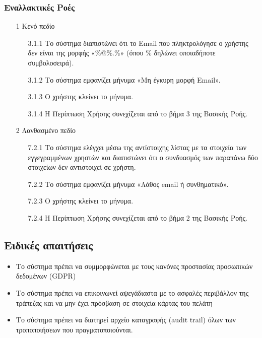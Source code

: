 \documentclass[12pt,a4paper,twoside]{book}
\begin{document}
\subsubsection{Εναλλακτικές Ροές}
\begin{enumerate}
  \item[1 ] Κενό πεδίο  %
        \begin{enumerate}
          \item[3.1.1 ] Το σύστημα διαπιστώνει ότι το Email που πληκτρολόγησε ο χρήστης δεν είναι της μορφής «\%@\%.\%» (όπου \% δηλώνει οποιαδήποτε συμβολοσειρά). %
          \item[3.1.2 ] Το σύστημα εμφανίζει μήνυμα «Μη έγκυρη μορφή Email». %
          \item[3.1.3 ] Ο χρήστης κλείνει το μήνυμα. %
          \item[3.1.4 ] Η Περίπτωση Χρήσης συνεχίζεται από το βήμα 3 της Βασικής Ροής. %
        \end{enumerate}
  \item[2 ] Λανθασμένο πεδίο %
        \begin{enumerate}
          \item[7.2.1 ] Το σύστημα ελέγχει μέσω της αντίστοιχης λίστας με τα στοιχεία των εγγεγραμμένων χρηστών και διαπιστώνει ότι ο συνδυασμός των παραπάνω δύο στοιχείων δεν αντιστοιχεί σε χρήστη. %
          \item[7.2.2 ] Το σύστημα εμφανίζει μήνυμα «Λάθος email ή συνθηματικό».  %
          \item[7.2.3 ] Ο χρήστης κλείνει το μήνυμα.%
          \item[7.2.4 ] Η Περίπτωση Χρήσης συνεχίζεται από το βήμα 2 της Βασικής Ροής. %
        \end{enumerate}
\end{enumerate}

\subsection{Ειδικές απαιτήσεις} %
\begin{itemize}
  \item Το σύστημα πρέπει να συμμορφώνεται με τους κανόνες προστασίας προσωπικών δεδομένων (GDPR)  %
  \item Το σύστημα πρέπει να επικοινωνεί αψεγάδιαστα με το ασφαλές περιβάλλον της τράπεζας και να μην έχει πρόσβαση σε στοιχεία κάρτας του πελάτη   %
  \item Το σύστημα πρέπει να διατηρεί αρχείο καταγραφής (audit trail) όλων των τροποποιήσεων που πραγματοποιούνται. %
\end{itemize}
\end{document}
